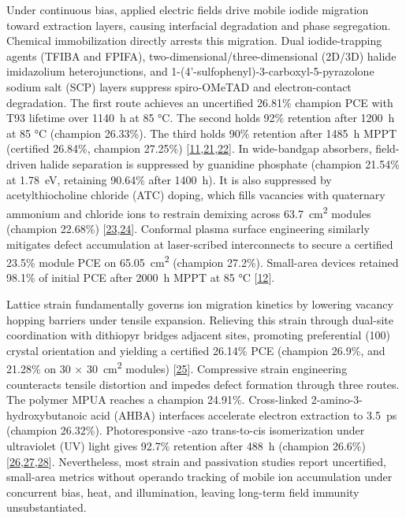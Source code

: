 \documentclass[
  11pt,
]{article}
\begin{document}
Under continuous bias, applied electric fields drive mobile iodide
migration toward extraction layers, causing interfacial degradation and
phase segregation. Chemical immobilization directly arrests this
migration. Dual iodide-trapping agents (TFIBA and FPIFA),
two-dimensional/three-dimensional (2D/3D) halide imidazolium
heterojunctions, and 1-(4'-sulfophenyl)-3-carboxyl-5-pyrazolone sodium
salt (SCP) layers suppress spiro-OMeTAD and electron-contact
degradation. The first route achieves an uncertified 26.81\% champion
PCE with T93 lifetime over \qty{1140}{\hour} at 85 °C. The second holds
92\% retention after \qty{1200}{\hour} at 85 °C (champion 26.33\%). The
third holds 90\% retention after \qty{1485}{\hour} MPPT (certified
26.84\%, champion 27.25\%)
{[}\href{https://doi.org/10.1002/aenm.71305}{11},\href{https://doi.org/10.1002/anie.2924886}{21},\href{https://doi.org/10.1002/adfm.77015}{22}{]}.
In wide-bandgap absorbers, field-driven halide separation is suppressed
by guanidine phosphate (champion 21.54\% at \qty{1.78}{\electronvolt},
retaining 90.64\% after \qty{1400}{\hour}). It is also suppressed by
acetylthiocholine chloride (ATC) doping, which fills vacancies with
quaternary ammonium and chloride ions to restrain demixing across
\qty{63.7}{\centi\meter\squared} modules (champion 22.68\%)
{[}\href{https://doi.org/10.1002/cnl2.70189}{23},\href{https://doi.org/10.1002/ece2.70102}{24}{]}.
Conformal plasma surface engineering similarly mitigates defect
accumulation at laser-scribed interconnects to secure a certified 23.5\%
module PCE on \qty{65.05}{\centi\meter\squared} (champion 27.2\%).
Small-area devices retained 98.1\% of initial PCE after
\qty{2000}{\hour} MPPT at 85 °C
{[}\href{https://doi.org/10.1126/science.aeg1730}{12}{]}.

Lattice strain fundamentally governs ion migration kinetics by lowering
vacancy hopping barriers under tensile expansion. Relieving this strain
through dual-site coordination with dithiopyr bridges adjacent
 sites, promoting preferential (100) crystal orientation and
yielding a certified 26.14\% PCE (champion 26.9\%, and 21.28\% on 30 ×
\qty{30}{\centi\meter\squared} modules)
{[}\href{https://doi.org/10.1002/adma.74033}{25}{]}. Compressive strain
engineering counteracts tensile distortion and impedes defect formation
through three routes. The polymer MPUA reaches a champion 24.91\%.
Cross-linked 2-amino-3-hydroxybutanoic acid (AHBA) interfaces accelerate
electron extraction to \qty{3.5}{\pico\second} (champion 26.32\%).
Photoresponsive -azo trans-to-cis isomerization under
ultraviolet (UV) light gives 92.7\% retention after \qty{488}{\hour}
(champion 26.6\%)
{[}\href{https://doi.org/10.1002/solr.70435}{26},\href{https://doi.org/10.1002/adfm.77373}{27},\href{https://doi.org/10.1002/adma.74220}{28}{]}.
Nevertheless, most strain and passivation studies report uncertified,
small-area metrics without operando tracking of mobile ion accumulation
under concurrent bias, heat, and illumination, leaving long-term field
immunity unsubstantiated.
\end{document}
